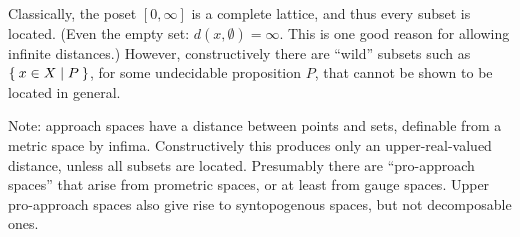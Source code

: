\documentclass{article}
\def\Rp{[0,\infty]}
\begin{document}
Classically, the poset $\Rp$ is a complete lattice, and thus every subset is located.
(Even the empty set: $d(x,\emptyset)=\infty$.
This is one good reason for allowing infinite distances.)
However, constructively there are ``wild'' subsets such as $\Set{x\in X | P}$, for some undecidable proposition $P$, that cannot be shown to be located in general.

Note: approach spaces have a distance between points and sets, definable from a metric space by infima.
Constructively this produces only an upper-real-valued distance, unless all subsets are located.
Presumably there are ``pro-approach spaces'' that arise from prometric spaces, or at least from gauge spaces.
Upper pro-approach spaces also give rise to syntopogenous spaces, but not decomposable ones.




\end{document}
